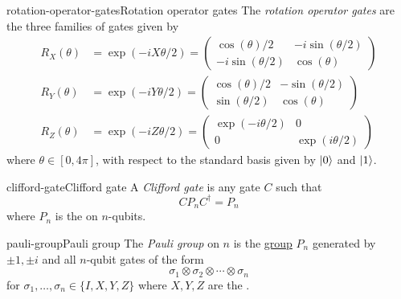 \begin{topic}{rotation-operator-gates}{Rotation operator gates}
    The \emph{rotation operator gates} are the three families of  gates given by
    \[ \begin{aligned}
        R_X(\theta) &= \exp(-i X \theta / 2) =  \begin{pmatrix} \cos(\theta) / 2 & - i \sin(\theta / 2) \\ - i \sin(\theta / 2) & \cos(\theta) \end{pmatrix} \\[15pt]
        R_Y(\theta) &= \exp(-i Y \theta / 2) =  \begin{pmatrix} \cos(\theta) / 2 & - \sin(\theta / 2) \\ \sin(\theta / 2) & \cos(\theta) \end{pmatrix} \\[15pt]
        R_Z(\theta) &= \exp(-i Z \theta / 2) =  \begin{pmatrix} \exp(-i \theta / 2) & 0 \\ 0 & \exp(i \theta / 2) \end{pmatrix}
    \end{aligned} \]
    where $\theta \in [0, 4\pi]$, with respect to the standard basis given by $|0\rangle$ and $|1\rangle$.
\end{topic}

\begin{topic}{clifford-gate}{Clifford gate}
    A \emph{Clifford gate} is any  gate $C$ such that
    \[ C P_n C^\dagger = P_n \]
    where $P_n$ is the  on $n$-qubits.
\end{topic}

\begin{topic}{pauli-group}{Pauli group}
    The \emph{Pauli group} on $n$  is the \href{/math-definitions/#GT:group}{group} $P_n$ generated by $\pm 1, \pm i$ and all $n$-qubit gates of the form
    \[ \sigma_1 \otimes \sigma_2 \otimes \cdots \otimes \sigma_n \]
    for $\sigma_1, \ldots, \sigma_n \in \{ I, X, Y, Z \}$ where $X, Y, Z$ are the .
\end{topic}
